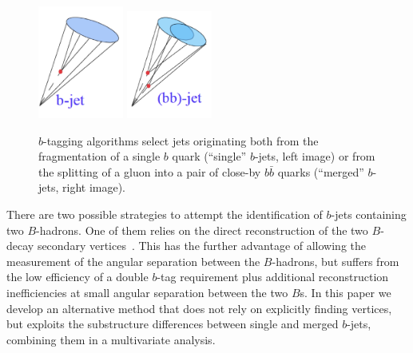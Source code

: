 \begin{figure}[h]
\centering
\includegraphics[width=0.25\textwidth]{FIGS/Single_b.png}
\hspace{1cm}
\includegraphics[width=0.25\textwidth]{FIGS/Merged_bb.png}
  \caption{$b$-tagging algorithms select jets originating both from the fragmentation of a single $b$ quark (``single'' $b$-jets, left image) or from the splitting of a gluon into a pair of close-by $b \bar{b}$ quarks (``merged'' $b$-jets, right image).}
  \label{fig:gbbcartoon}
\end{figure}

There are two possible strategies to attempt the identification of $b$-jets containing two $B$-hadrons. One of them relies on the direct reconstruction of the two $B$-decay secondary vertices~\cite{CDFAzimutalCorrelation}. This has the further advantage of allowing the measurement of the angular separation between the $B$-hadrons, but suffers from the low efficiency of a double $b$-tag requirement plus additional reconstruction inefficiencies at small angular separation between the two $B$s. In this paper we develop an alternative method that does not rely on explicitly finding vertices, but exploits the substructure differences between single and merged $b$-jets, combining them in a multivariate analysis. 

